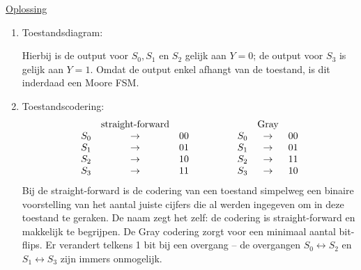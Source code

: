 \documentclass{kuburgiearticle}
\begin{document}
	\underline{Oplossing}
	\begin{enumerate}
		\item Toestandsdiagram:
		\begin{figure}[h!]
			\centering
			
		\end{figure}

		Hierbij is de output voor \(S_0, S_1\) en \(S_2\) gelijk aan \(Y=0\); de output voor \(S_3\) is gelijk aan \(Y=1\). Omdat de output enkel afhangt van de toestand, is dit inderdaad een Moore FSM.

		\item Toestandscodering:
		\begin{align*}
			\begin{array}{c c c}
				& \text{straight-forward} &\\
				S_0 & \rightarrow & 00 \\
				S_1 & \rightarrow & 01 \\
				S_2 & \rightarrow & 10 \\
				S_3 & \rightarrow & 11 \\
			\end{array} \qquad \qquad \begin{array}{c c c}
			& \text{Gray} &\\
			S_0 & \rightarrow & 00 \\
			S_1 & \rightarrow & 01 \\
			S_2 & \rightarrow & 11 \\
			S_3 & \rightarrow & 10 \\
			\end{array}
		\end{align*}
		Bij de straight-forward is de codering van een toestand simpelweg een binaire voorstelling van het aantal juiste cijfers die al werden ingegeven om in deze toestand te geraken. De naam zegt het zelf: de codering is straight-forward en makkelijk te begrijpen. De Gray codering zorgt voor een minimaal aantal bit-flips. Er verandert telkens 1 bit bij een overgang -- de overgangen \(S_0 \leftrightarrow S_2\) en \(S_1 \leftrightarrow S_3\) zijn immers onmogelijk.
	\end{enumerate}
\end{document}
